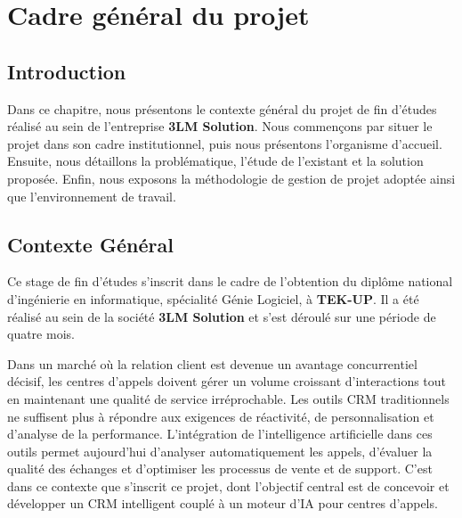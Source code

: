 \chapter{Cadre général du projet}

\section*{Introduction}
\label{sec:chap1_introduction}

Dans ce chapitre, nous présentons le contexte général du projet de fin d'études réalisé au sein
de l'entreprise \textbf{3LM Solution}. Nous commençons par situer le projet dans son cadre
institutionnel, puis nous présentons l'organisme d'accueil. Ensuite, nous détaillons la
problématique, l'étude de l'existant et la solution proposée. Enfin, nous exposons la
méthodologie de gestion de projet adoptée ainsi que l'environnement de travail.

\section{Contexte Général}
\label{sec:chap1_contexte_general}

Ce stage de fin d'études s'inscrit dans le cadre de l'obtention du diplôme national d'ingénierie
en informatique, spécialité Génie Logiciel, à \textbf{TEK-UP}. Il a été réalisé au sein de la
société \textbf{3LM Solution} et s'est déroulé sur une période de quatre mois.

Dans un marché où la relation client est devenue un avantage concurrentiel décisif, les centres
d'appels doivent gérer un volume croissant d'interactions tout en maintenant une qualité de
service irréprochable. Les outils CRM traditionnels ne suffisent plus à répondre aux exigences
de réactivité, de personnalisation et d'analyse de la performance. L'intégration de
l'intelligence artificielle dans ces outils permet aujourd'hui d'analyser automatiquement les
appels, d'évaluer la qualité des échanges et d'optimiser les processus de vente et de support.
C'est dans ce contexte que s'inscrit ce projet, dont l'objectif central est de concevoir et
développer un CRM intelligent couplé à un moteur d'IA pour centres d'appels.

